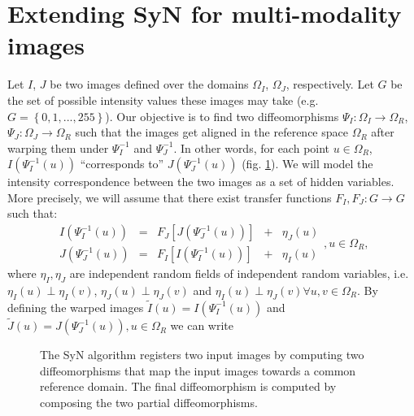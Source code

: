 \section{Extending SyN for multi-modality images}

Let $I$, $J$ be two images defined over the domains $\Omega_{I}$, $\Omega_{J}$, respectively. Let $G$ be the set of
possible intensity values these images may take (e.g. $G=\left\lbrace 0,1,...,255\right\rbrace$). Our objective is to find two diffeomorphisms
$\Psi_{I}:\Omega_{I}\rightarrow \Omega_{R}$, $\Psi_{J}:\Omega_{J}\rightarrow \Omega_{R}$ such that the images get aligned in the reference space $\Omega_{R}$
after warping them under $\Psi_{I}^{-1}$ and $\Psi_{J}^{-1}$. In other words, for each point $u \in \Omega_{R}$, $I(\Psi_{I}^{-1}(u))$ ``corresponds to'' $J(\Psi_{J}^{-1}(u))$
(fig. \ref{fig:syn_overview}). We will model the intensity correspondence between the two images as a set of hidden variables. More precisely, we will assume that there exist transfer functions
$F_{I}, F_{J}:G \rightarrow G$ such that:\\
\begin{equation}\label{eq:SyNEM_gom_ref}
    \begin{array}{ccccc}
        I(\Psi_{I}^{-1}(u)) &=& F_{J}[J(\Psi_{J}^{-1}(u))] &+& \eta_{J}(u)\\
        J(\Psi_{J}^{-1}(u)) &=& F_{I}[I(\Psi_{I}^{-1}(u))] &+& \eta_{I}(u)
    \end{array}, u\in\Omega_{R},
\end{equation}
where $\eta_{I}, \eta_{J}$ are independent random fields of independent random variables, i.e. $\eta_{I}(u) \perp \eta_{I}(v)$,
$\eta_{J}(u) \perp \eta_{J}(v)$ and $\eta_{I}(u) \perp \eta_{J}(v) \forall u,v\in \Omega_{R}$. By defining the warped images $\tilde{I}(u) = I(\Psi_{I}^{-1}(u))$
and $\tilde{J}(u) = J(\Psi_{J}^{-1}(u)), u \in \Omega_{R}$ we can write

\begin{figure}[H]
\centering
{}
\caption{The SyN algorithm registers two input images by computing two diffeomorphisms that map the input images towards a common reference domain. The final
diffeomorphism is computed by composing the two partial diffeomorphisms.}
\label{fig:syn_overview}
\end{figure}

